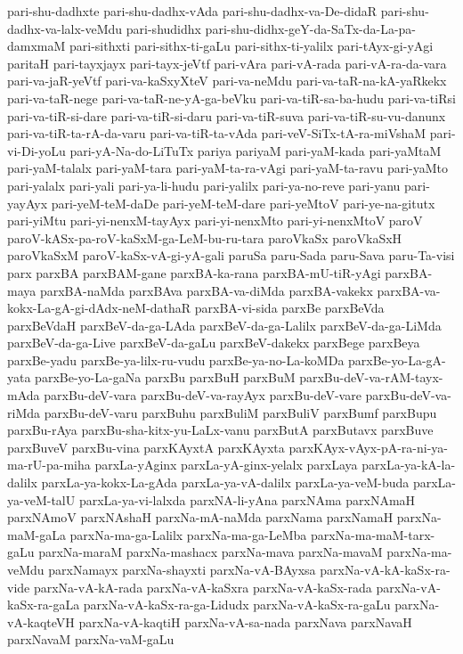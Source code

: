 {pari-shu-dadhxte
pari-shu-dadhx-vAda
pari-shu-dadhx-va-De-didaR
pari-shu-dadhx-va-lalx-veMdu
pari-shudidhx
pari-shu-didhx-geY-da-SaTx-da-La-pa-damxmaM
pari-sithxti
pari-sithx-ti-gaLu
pari-sithx-ti-yalilx
pari-tAyx-gi-yAgi
paritaH
pari-tayxjayx
pari-tayx-jeVtf
pari-vAra
pari-vA-rada
pari-vA-ra-da-vara
pari-va-jaR-yeVtf
pari-va-kaSxyXteV
pari-va-neMdu
pari-va-taR-na-kA-yaRkekx
pari-va-taR-nege
pari-va-taR-ne-yA-ga-beVku
pari-va-tiR-sa-ba-hudu
pari-va-tiRsi
pari-va-tiR-si-dare
pari-va-tiR-si-daru
pari-va-tiR-suva
pari-va-tiR-su-vu-danunx
pari-va-tiR-ta-rA-da-varu
pari-va-tiR-ta-vAda
pari-veV-SiTx-tA-ra-miVshaM
pari-vi-Di-yoLu
pari-yA-Na-do-LiTuTx
pariya
pariyaM
pari-yaM-kada
pari-yaMtaM
pari-yaM-talalx
pari-yaM-tara
pari-yaM-ta-ra-vAgi
pari-yaM-ta-ravu
pari-yaMto
pari-yalalx
pari-yali
pari-ya-li-hudu
pari-yalilx
pari-ya-no-reve
pari-yanu
pari-yayAyx
pari-yeM-teM-daDe
pari-yeM-teM-dare
pari-yeMtoV
pari-ye-na-gitutx
pari-yiMtu
pari-yi-nenxM-tayAyx
pari-yi-nenxMto
pari-yi-nenxMtoV
paroV
paroV-kASx-pa-roV-kaSxM-ga-LeM-bu-ru-tara
paroVkaSx
paroVkaSxH
paroVkaSxM
paroV-kaSx-vA-gi-yA-gali
paruSa
paru-Sada
paru-Sava
paru-Ta-visi
parx
parxBA
parxBAM-gane
parxBA-ka-rana
parxBA-mU-tiR-yAgi
parxBA-maya
parxBA-naMda
parxBAva
parxBA-va-diMda
parxBA-vakekx
parxBA-va-kokx-La-gA-gi-dAdx-neM-dathaR
parxBA-vi-sida
parxBe
parxBeVda
parxBeVdaH
parxBeV-da-ga-LAda
parxBeV-da-ga-Lalilx
parxBeV-da-ga-LiMda
parxBeV-da-ga-Live
parxBeV-da-gaLu
parxBeV-dakekx
parxBege
parxBeya
parxBe-yadu
parxBe-ya-lilx-ru-vudu
parxBe-ya-no-La-koMDa
parxBe-yo-La-gA-yata
parxBe-yo-La-gaNa
parxBu
parxBuH
parxBuM
parxBu-deV-va-rAM-tayx-mAda
parxBu-deV-vara
parxBu-deV-va-rayAyx
parxBu-deV-vare
parxBu-deV-va-riMda
parxBu-deV-varu
parxBuhu
parxBuliM
parxBuliV
parxBumf
parxBupu
parxBu-rAya
parxBu-sha-kitx-yu-LaLx-vanu
parxButA
parxButavx
parxBuve
parxBuveV
parxBu-vina
parxKAyxtA
parxKAyxta
parxKAyx-vAyx-pA-ra-ni-ya-ma-rU-pa-miha
parxLa-yAginx
parxLa-yA-ginx-yelalx
parxLaya
parxLa-ya-kA-la-dalilx
parxLa-ya-kokx-La-gAda
parxLa-ya-vA-dalilx
parxLa-ya-veM-buda
parxLa-ya-veM-talU
parxLa-ya-vi-lalxda
parxNA-li-yAna
parxNAma
parxNAmaH
parxNAmoV
parxNAshaH
parxNa-mA-naMda
parxNama
parxNamaH
parxNa-maM-gaLa
parxNa-ma-ga-Lalilx
parxNa-ma-ga-LeMba
parxNa-ma-maM-tarx-gaLu
parxNa-maraM
parxNa-mashacx
parxNa-mava
parxNa-mavaM
parxNa-ma-veMdu
parxNamayx
parxNa-shayxti
parxNa-vA-BAyxsa
parxNa-vA-kA-kaSx-ra-vide
parxNa-vA-kA-rada
parxNa-vA-kaSxra
parxNa-vA-kaSx-rada
parxNa-vA-kaSx-ra-gaLa
parxNa-vA-kaSx-ra-ga-Lidudx
parxNa-vA-kaSx-ra-gaLu
parxNa-vA-kaqteVH
parxNa-vA-kaqtiH
parxNa-vA-sa-nada
parxNava
parxNavaH
parxNavaM
parxNa-vaM-gaLu
}
